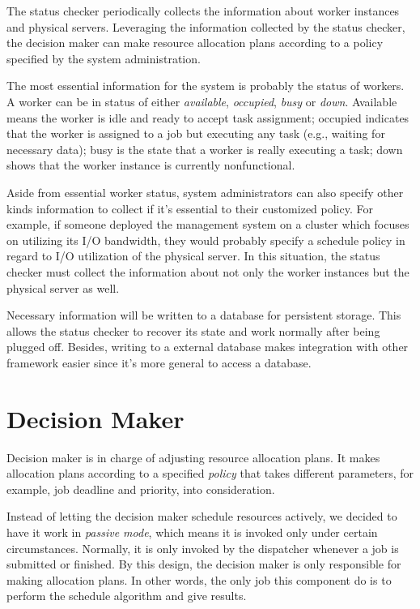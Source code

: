 The status checker periodically collects the information about worker
instances and physical servers.  Leveraging the information collected
by the status checker, the decision maker can make resource allocation
plans according to a policy specified by the system administration.

The most essential information for the system is probably the status of
workers.  A worker can be in status of either \emph{available},
\emph{occupied}, \emph{busy} or \emph{down}.  Available means the worker
is idle and ready to accept task assignment; occupied indicates that the
worker is assigned to a job but executing any task (e.g., waiting for
necessary data); busy is the state that a worker is really executing a
task; down shows that the worker instance is currently nonfunctional. 

Aside from essential worker status, system administrators can also
specify other kinds information to collect if it's essential to  their
customized policy.  For example, if someone deployed the management
system on a cluster which focuses on utilizing its I/O bandwidth, they
would probably specify a schedule policy in regard to I/O utilization of
the physical server.  In this situation, the status checker must collect
the information about not only the worker instances but the physical
server as well.

Necessary information will be written to a database for persistent
storage.  This allows the status checker to recover its state and work
normally after being plugged off.  Besides, writing to a external
database makes integration with other framework easier since it's more
general to access a database.

\section{Decision Maker}

Decision maker is in charge of adjusting resource allocation plans.  It
makes allocation plans according to a specified \emph{policy} that takes
different parameters, for example, job deadline and priority, into
consideration. 

Instead of letting the decision maker schedule resources actively, we
decided to have it work in \emph{passive mode}, which means it is
invoked only under certain circumstances.  Normally, it is only invoked
by the dispatcher whenever a job is submitted or finished.  By this
design, the decision maker is only responsible for making allocation
plans.  In other words, the only job this component do is to perform the
schedule algorithm and give results.  

